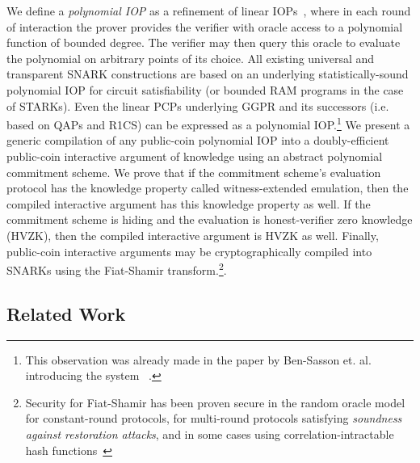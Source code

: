 We define a \emph{polynomial IOP} as a refinement of linear IOPs~\cite{IKO07, C:BBGGI19}, where in each round of interaction the prover provides the verifier with oracle access to a polynomial function of bounded degree. The verifier may then query this oracle to evaluate the polynomial on arbitrary points of its choice. All existing universal and transparent SNARK constructions are based on an underlying statistically-sound polynomial IOP for circuit satisfiability (or bounded RAM programs in the case of STARKs). Even the linear PCPs underlying GGPR and its successors (i.e. based on QAPs and R1CS) can be expressed as a polynomial IOP.\footnote{This observation was already made in the paper by Ben-Sasson et. al. introducing the system ~\cite{BCRSVW}.} We present a generic compilation of any public-coin polynomial IOP into a doubly-efficient public-coin interactive argument of knowledge using an abstract polynomial commitment scheme. We prove that if the commitment scheme's evaluation protocol has the knowledge property called witness-extended emulation, then the compiled interactive argument has this knowledge property as well. If the commitment scheme is hiding and the evaluation is honest-verifier zero knowledge (HVZK), then the compiled interactive argument is HVZK as well. Finally, public-coin interactive arguments may be cryptographically compiled into SNARKs using the Fiat-Shamir transform.\footnote{Security for Fiat-Shamir has been proven secure in the random oracle model for constant-round protocols, for multi-round protocols satisfying \emph{soundness against restoration attacks}, and in some cases using correlation-intractable hash functions~\cite{C:FiaSha86,EC:PoiSte96,CSproofs,TCC:HalMyeRac08,TCC:BenChiSpo16,EC:AABN02,C:KalRotRot17, EC:CCRR18,FOCS:HolLom18,CCHLRR18,STOC:CCHLRRW19}}. 

\subsection{Related Work}


